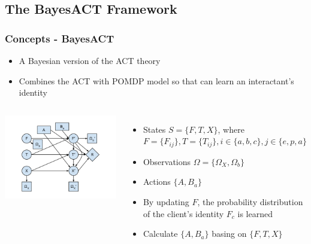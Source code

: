 \documentclass{beamer}
\begin{document}
\subsection{The BayesACT Framework}
\begin{frame}
\frametitle{Concepts - BayesACT}
\begin{itemize}
\item A Bayesian version of the ACT theory
\item Combines the ACT with POMDP model so that can learn an interactant's identity
\end{itemize}
\pause
\begin{columns}[c]
\includegraphics[trim = 20mm 10mm 20mm 10mm, clip, width=\linewidth]{fig/fig-bayesact.pdf}
\begin{itemize}
\pause \item States $S = \{F, T, X\}$, where $F = \{F_{ij}\}, T = \{T_{ij}\}, i \in \{a, b, c\}, j \in \{e, p, a\}$
\pause \item Observations $\Omega = \{\Omega_{X}, \Omega_{b}\}$
\pause \item Actions $\{A, B_{a}\}$
\pause \item By updating $F$, the probability distribution of the client's identity $F_{c}$ is learned
\pause \item Calculate $\{A, B_{a}\}$ basing on $\{F, T, X\}$
\end{itemize}
\end{columns}
\end{frame}
\end{document}
